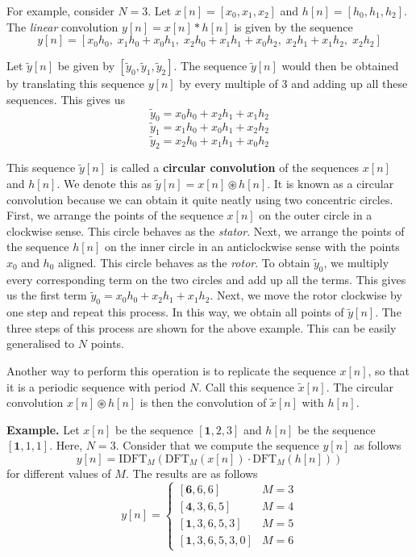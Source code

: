 \documentclass{article}
\theoremstyle{definition}
\begin{document}
For example, consider $N=3$. Let $x[n] = [ x_0, x_1, x_2 ]$ and $h[n] = [ h_0 , h_1, h_2 ]$. The \textit{linear} convolution $y[n] = x[n] * h[n]$ is given by the sequence 
\[
    y[n] = \left[ x_0h_0 , \; x_1h_0 + x_0h_1 , \; x_2h_0 + x_1h_1 + x_0h_2 , \; x_2h_1 + x_1h_2 , \; x_2h_2 \right]
\]

Let $\widetilde{y}[n]$ be given by $[ \widetilde{y}_{0} , \widetilde{y}_{1} , \widetilde{y}_{2} ]$. The sequence $\widetilde{y}[n]$ would then be obtained by translating this sequence $y[n]$ by every multiple of $3$ and adding up all these sequences. This gives us 
\[
    \widetilde{y}_{0} = x_0h_0 + x_2h_1 + x_1h_2
\]
\[
    \widetilde{y}_{1} = x_1h_0 + x_0h_1 + x_2h_2 
\]
\[
    \widetilde{y}_{2} = x_2h_0 + x_1h_1 + x_0h_2
\]

This sequence $\widetilde{y}[n]$ is called a \textbf{circular convolution} of the sequences $x[n]$ and $h[n]$. We denote this as $\widetilde{y}[n] = x[n] \circledast h[n]$. It is known as a circular convolution because we can obtain it quite neatly using two concentric circles. First, we arrange the points of the sequence $x[n]$ on the outer circle in a clockwise sense. This circle behaves as the \textit{stator}. Next, we arrange the points of the sequence $h[n]$ on the inner circle in an anticlockwise sense with the points $x_0$ and $h_0$ aligned. This circle behaves as the \textit{rotor}. To obtain $\widetilde{y}_{0}$, we multiply every corresponding term on the two circles and add up all the terms. This gives us the first term $\widetilde{y}_{0} = x_0h_0 + x_2h_1 + x_1h_2$. Next, we move the rotor clockwise by one step and repeat this process. In this way, we obtain all points of $\widetilde{y}[n]$. The three steps of this process are shown for the above example. This can be easily generalised to $N$ points. \medskip

Another way to perform this operation is to replicate the sequence $x[n]$, so that it is a periodic sequence with period $N$. Call this sequence $\widetilde{x}[n]$. The circular convolution $x[n] \circledast h[n]$ is then the convolution of $\widetilde{x}[n]$ with $h[n]$. \medskip

\textbf{Example.} Let $x[n]$ be the sequence $[\mathbf{1},2,3]$ and $h[n]$ be the sequence $[ \mathbf{1} , 1 , 1 ]$. Here, $N = 3$. Consider that we compute the sequence $y[n]$ as follows
\[
    y[n] = \text{IDFT}_M( \text{DFT}_M(x[n]) \cdot \text{DFT}_M(h[n]))
\]
for different values of $M$. The results are as follows
\[
    y[n] = 
    \begin{cases}
        [\mathbf{6}, 6, 6] & M = 3 \\
        [\mathbf{4}, 3, 6, 5] & M = 4\\
        [\mathbf{1}, 3, 6, 5, 3] & M = 5\\
        [\mathbf{1}, 3, 6, 5, 3, 0] & M = 6
    \end{cases}
\]
\end{document}
